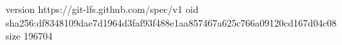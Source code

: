 version https://git-lfs.github.com/spec/v1
oid sha256:df8348109dae7d1964d3faf93f488e1aa857467a625c766a09120cd167d04c08
size 196704
